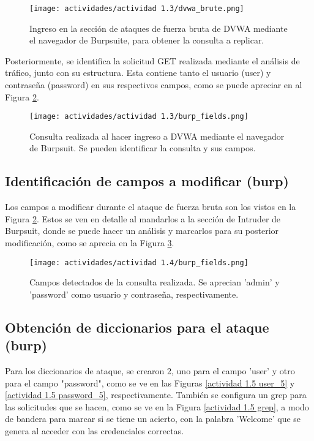 \documentclass[letter,12pt]{article}
\begin{document}
\begin{figure}[H]
    \centering
    \texttt{[image: actividades/actividad 1.3/dvwa\_brute.png]}
    \caption{Ingreso en la sección de ataques de fuerza bruta de DVWA mediante el navegador de Burpsuite, para obtener la consulta a replicar.}
    \label{actividad 1.3 dvwa_brute}
\end{figure}

Posteriormente, se identifica la solicitud GET realizada mediante el análisis de tráfico, junto con su estructura. Esta contiene tanto el usuario (user) y contraseña (password) en sus respectivos campos, como se puede apreciar en al Figura \ref{actividad 1.3 burp_fields}.

\begin{figure}[H]
    \centering
    \texttt{[image: actividades/actividad 1.3/burp\_fields.png]}
    \caption{Consulta realizada al hacer ingreso a DVWA mediante el navegador de Burpsuit. Se pueden identificar la consulta y sus campos.}
    \label{actividad 1.3 burp_fields}
\end{figure}

\subsection{Identificación de campos a modificar (burp)}
Los campos a modificar durante el ataque de fuerza bruta son los vistos en la Figura \ref{actividad 1.3 burp_fields}. Estos se ven en detalle al mandarlos a la sección de Intruder de Burpsuit, donde se puede hacer un análisis y marcarlos para su posterior modificación, como se aprecia en la Figura \ref{actividad 1.4 burp_fields}.

\begin{figure}[H]
    \centering
    \texttt{[image: actividades/actividad 1.4/burp\_fields.png]}
    \caption{Campos detectados de la consulta realizada. Se aprecian 'admin' y 'password' como usuario y contraseña, respectivamente.}
    \label{actividad 1.4 burp_fields}
\end{figure}

\subsection{Obtención de diccionarios para el ataque (burp)}
Para los diccionarios de ataque, se crearon 2, uno para el campo 'user' y otro para el campo "password", como se ve en las Figuras \ref{actividad 1.5 user_5} y \ref{actividad 1.5 password_5}, respectivamente. También se configura un grep para las solicitudes que se hacen, como se ve en la Figura \ref{actividad 1.5 grep}, a modo de bandera para marcar si se tiene un acierto, con la palabra 'Welcome' que se genera al acceder con las credenciales correctas.
\end{document}
